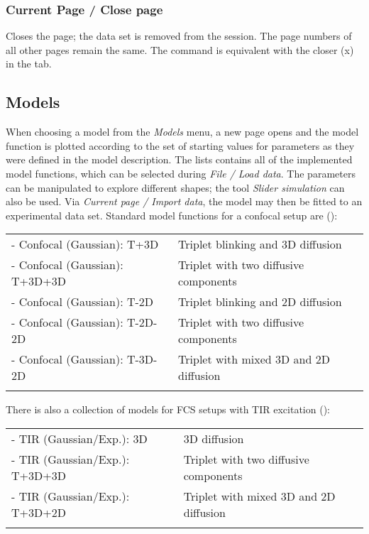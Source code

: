 \subsubsection{Current Page / Close page}
\label{sec:menub.curre.close}
Closes the page; the data set is removed from the session. The page numbers of all other pages remain the same. The command is equivalent with the closer (x) in the tab. 

\subsection{Models}
\label{sec:menub.model}
When choosing a model from the \textit{Models} menu, a new page opens and the model function is plotted according to the set of starting values for parameters as they were defined in the model description. The lists contains all of the implemented model functions, which can be selected during \textit{File / Load data}. The parameters can be manipulated to explore different shapes; the tool \textit{Slider simulation} can also be used. Via \textit{Current page / Import data}, the model may then be fitted to an experimental data set. Standard model functions for a confocal setup are ():

\begin{tabular}{l l}
\rule{0pt}{3ex} - Confocal (Gaussian): T+3D & Triplet blinking and 3D diffusion \\
\rule{0pt}{3ex} - Confocal (Gaussian): T+3D+3D & Triplet with two diffusive components \\
\rule{0pt}{3ex} - Confocal (Gaussian): T-2D &  Triplet blinking and 2D diffusion \\
\rule{0pt}{3ex} - Confocal (Gaussian): T-2D-2D & Triplet with two diffusive components \\
\rule{0pt}{3ex} - Confocal (Gaussian): T-3D-2D &  Triplet with mixed 3D and 2D diffusion \\
\rule{0pt}{3ex}
\end{tabular}

\noindent There is also a collection of models for FCS setups with TIR excitation ():

\begin{tabular}{l l}
\rule{0pt}{3ex} - TIR (Gaussian/Exp.): 3D & 3D diffusion \\
\rule{0pt}{3ex} - TIR (Gaussian/Exp.): T+3D+3D & Triplet with two diffusive components \\
\rule{0pt}{3ex} - TIR (Gaussian/Exp.): T+3D+2D & Triplet with mixed 3D and 2D diffusion \\
\rule{0pt}{3ex}
\end{tabular}

